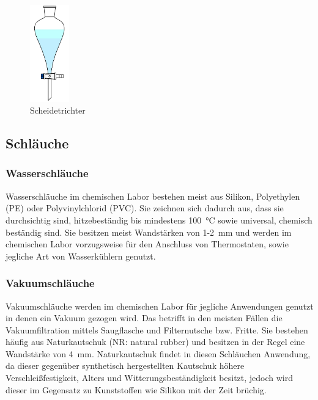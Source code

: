  \begin{figure}[h!]
	\centering
	\includegraphics[width=0.15\textwidth]{img/scheidetrichter}
	\caption{Scheidetrichter}
	\label{fig:scheidetrichter}
\end{figure}
\FloatBarrier

\subsection{Schläuche}
\subsubsection{Wasserschläuche}
Wasserschläuche im chemischen Labor bestehen meist aus Silikon, Polyethylen (PE) oder Polyvinylchlorid (PVC). Sie zeichnen sich dadurch aus, dass sie durchsichtig sind, hitzebeständig bis mindestens \SI{100}{\celsius} sowie universal, chemisch beständig sind. 
Sie besitzen meist Wandstärken von 1-\SI{2}{\milli \meter} und werden im chemischen Labor vorzugsweise für den Anschluss von Thermostaten, sowie jegliche Art von Wasserkühlern genutzt.

\vspace{-5mm}

\subsubsection{Vakuumschläuche}
Vakuumschläuche werden im chemischen Labor für jegliche Anwendungen genutzt in denen ein Vakuum gezogen wird. Das betrifft in den meisten Fällen die Vakuumfiltration mittels Saugflasche und Filternutsche bzw. Fritte. Sie bestehen häufig aus Naturkautschuk (NR: natural rubber) und besitzen in der Regel eine Wandstärke von \SI{4}{\milli \meter}. Naturkautschuk findet in diesen Schläuchen Anwendung, da dieser gegenüber synthetisch hergestellten Kautschuk höhere Verschleißfestigkeit, Alters und Witterungsbeständigkeit besitzt, jedoch wird dieser im Gegensatz zu Kunststoffen wie Silikon mit der Zeit brüchig.\\

